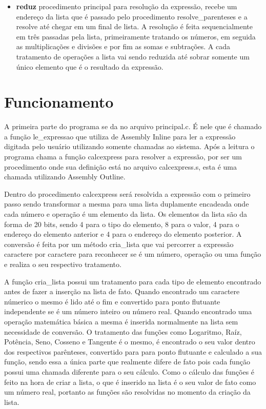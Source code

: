 \documentclass[12pt]{article}
\begin{document}
\begin{itemize}
\item \textbf{reduz} procedimento principal para resolução da expressão, recebe um endereço da lista que é passado pelo procedimento resolve\_parenteses e a resolve até chegar em um final de lista. A resolução é feita sequencialmente em três passadas pela lista, primeiramente tratando os números, em seguida as multiplicações e divisões e por fim as somas e subtrações. A cada tratamento de operações a lista vai sendo reduzida até sobrar somente um único elemento que é o resultado da expressão.

\end{itemize}

\section*{Funcionamento}

A primeira parte do programa se da no arquivo principal.c. É nele que é chamado a função le\_expressao que utiliza de Assembly Inline para ler a expressão digitada pelo usuário utilizando somente chamadas ao sistema. Após a leitura o programa chama a função calcexpress para resolver a expressão, por ser um procedimento onde sua definição está no arquivo calcexpress.s, esta é uma chamada utilizando Assembly Outline.

Dentro do procedimento calcexpress será resolvida a expressão com o primeiro passo sendo transformar a mesma para uma lista duplamente encadeada onde cada número e operação é um elemento da lista. Os elementos da lista são da forma de 20 bits, sendo 4 para o tipo do elemento, 8 para o valor, 4 para o endereço do elemento anterior e 4 para o endereço do elemento posterior. A conversão é feita por um método cria\_lista que vai percorrer a expressão caractere por caractere para reconhecer se é um número, operação ou uma função e realiza o seu respectivo tratamento.

A função cria\_lista possui um tratamento para cada tipo de elemento encontrado antes de fazer a inserção na lista de fato. Quando encontrado um caractere númerico o mesmo é lido até o fim e convertido para ponto flutuante independente se é um número inteiro ou número real. Quando encontrado uma operação matemática básica a mesma é inserida normalmente na lista sem necessidade de conversão. O tratamento das funções como Logaritmo, Raíz, Potência, Seno, Cosseno e Tangente é o mesmo, é encontrado o seu valor dentro dos respectivos parênteses, convertido para para ponto flutuante e calculado a sua função, sendo essa a única parte que realmente difere de fato pois cada função possui uma chamada diferente para o seu cálculo. Como o cálculo das funções é feito na hora de criar a lista, o que é inserido na lista é o seu valor de fato como um número real, portanto as funções são resolvidas no momento da criação da lista.
\end{document}

